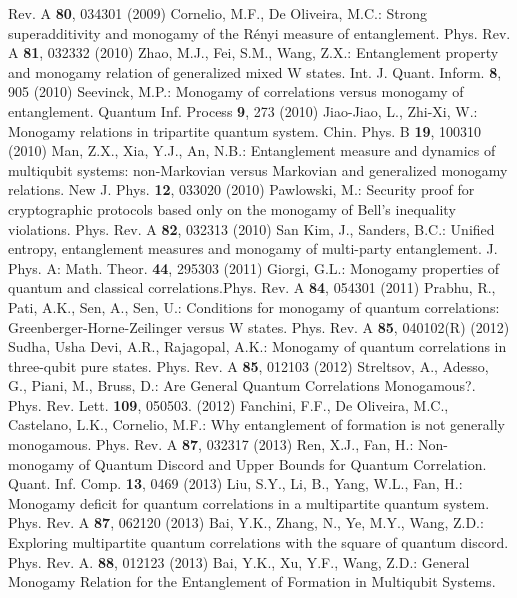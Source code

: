 \documentclass[pra,a4paper,showpacs,superscriptaddress]{revtex4}
\begin{document}
\begin{thebibliography}{50}
 Rev. A {\bf 80}, 034301 (2009)
 Cornelio, M.F., De Oliveira, M.C.: Strong 
superadditivity and monogamy of the Rényi measure of entanglement. 
Phys. Rev. 
A {\bf 81}, 032332 (2010)
 Zhao, M.J., Fei, S.M., Wang, Z.X.: Entanglement 
property and monogamy
relation of generalized mixed W states. Int. J. Quant. Inform. {\bf 
8}, 905 (2010)
 Seevinck, M.P.: Monogamy of correlations versus 
monogamy
of entanglement. Quantum Inf. Process {\bf 
9}, 273 (2010)
 Jiao-Jiao, L., Zhi-Xi, W.:  Monogamy relations in 
tripartite quantum system. Chin. Phys. 
B {\bf 19}, 100310 (2010)
  Man, Z.X., Xia, Y.J., An, N.B.: Entanglement measure 
and dynamics of multiqubit
systems: non-Markovian versus Markovian and
generalized monogamy relations. 
New J. Phys. {\bf 12}, 033020 (2010) 
 Pawlowski, M.: Security proof for cryptographic 
protocols based only on the monogamy
of Bell’s inequality violations. Phys. Rev. A {\bf 82}, 032313 (2010)
 San Kim, J., Sanders, B.C.: Unified entropy, 
entanglement 
measures and
monogamy of multi-party entanglement. J. Phys. A: Math. 
Theor. {\bf 44}, 295303 (2011)
 Giorgi, G.L.: Monogamy properties of quantum and 
classical correlations.Phys. Rev. A {\bf 84}, 054301 (2011)
 Prabhu, R., Pati, A.K., Sen, A., Sen, U.: 
Conditions for monogamy of quantum correlations: 
Greenberger-Horne-Zeilinger versus W states. Phys. Rev. A {\bf 85}, 
040102(R) (2012)
 Sudha, Usha Devi, A.R., Rajagopal, A.K.: Monogamy of 
quantum correlations in three-qubit pure states.  
Phys. Rev. A {\bf 85}, 012103 (2012) 
 Streltsov, A., Adesso, G., Piani, M., Bruss, D.: Are 
General Quantum Correlations Monogamous?. 
Phys. Rev. Lett. {\bf 109}, 050503. (2012)
 Fanchini, F.F., De Oliveira, M.C., Castelano, L.K., 
Cornelio, M.F.: Why entanglement of formation is not generally 
monogamous. Phys. Rev. A {\bf 87}, 032317 (2013)
  Ren, X.J., Fan, H.: Non-monogamy of Quantum Discord and 
Upper Bounds for Quantum Correlation. Quant. Inf. Comp. 
{\bf 13}, 0469 (2013)
  Liu, S.Y., Li, B., Yang, W.L., Fan, H.: Monogamy 
deficit for quantum correlations in a multipartite quantum system. 
Phys. Rev. A {\bf 87}, 062120 (2013)
  Bai, Y.K., Zhang, N., Ye, M.Y., Wang, Z.D.: Exploring 
multipartite quantum correlations with the square of quantum discord.
 Phys. Rev. A. {\bf 88}, 012123 (2013)
 Bai, Y.K., Xu, Y.F., Wang, Z.D.: General Monogamy 
Relation for the Entanglement of Formation in Multiqubit Systems. 

\end{thebibliography}
\end{document}
